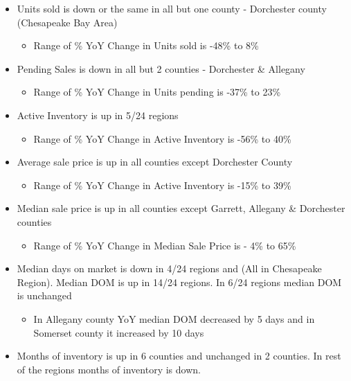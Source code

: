\documentclass[
]{article}
\providecommand{\tightlist}{%
  \setlength{\itemsep}{0pt}\setlength{\parskip}{0pt}}
\begin{document}
\begin{itemize}
\tightlist
\item
  Units sold is down or the same in all but one county - Dorchester
  county (Chesapeake Bay Area)

  \begin{itemize}
  \tightlist
  \item
    Range of \% YoY Change in Units sold is -48\% to 8\%
  \end{itemize}
\item
  Pending Sales is down in all but 2 counties - Dorchester \& Allegany

  \begin{itemize}
  \tightlist
  \item
    Range of \% YoY Change in Units pending is -37\% to 23\%
  \end{itemize}
\item
  Active Inventory is up in 5/24 regions

  \begin{itemize}
  \tightlist
  \item
    Range of \% YoY Change in Active Inventory is -56\% to 40\%
  \end{itemize}
\item
  Average sale price is up in all counties except Dorchester County

  \begin{itemize}
  \tightlist
  \item
    Range of \% YoY Change in Active Inventory is -15\% to 39\%
  \end{itemize}
\item
  Median sale price is up in all counties except Garrett, Allegany \&
  Dorchester counties

  \begin{itemize}
  \tightlist
  \item
    Range of \% YoY Change in Median Sale Price is - 4\% to 65\%
  \end{itemize}
\item
  Median days on market is down in 4/24 regions and (All in Chesapeake
  Region). Median DOM is up in 14/24 regions. In 6/24 regions median DOM
  is unchanged

  \begin{itemize}
  \tightlist
  \item
    In Allegany county YoY median DOM decreased by 5 days and in
    Somerset county it increased by 10 days
  \end{itemize}
\item
  Months of inventory is up in 6 counties and unchanged in 2 counties.
  In rest of the regions months of inventory is down.


\end{itemize}
\end{document}
